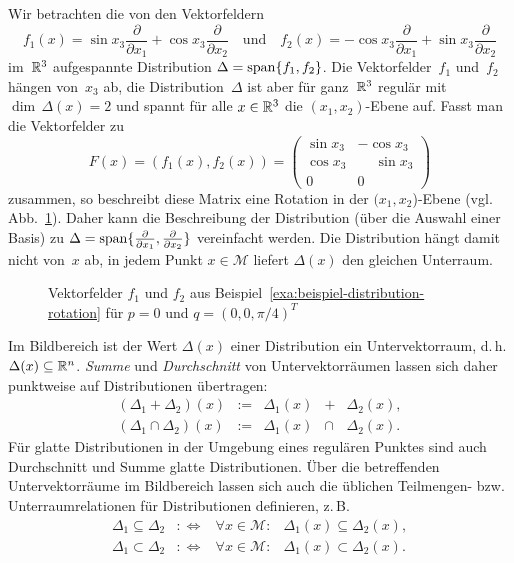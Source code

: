 \begin{example}
\label{exa:beispiel-distribution-rotation}Wir betrachten die von
den Vektorfeldern 
\[
f_{1}(x)=\sin x_{3}\frac{\partial}{\partial x_{1}}+\cos x_{3}\frac{\partial}{\partial x_{2}}\quad\mbox{und}\quad f_{2}(x)=-\cos x_{3}\frac{\partial}{\partial x_{1}}+\sin x_{3}\frac{\partial}{\partial x_{2}}
\]
im~${\mathbb{R}}^{3}$ aufgespannte Distribution $\Delta={\operatorname{span}}\{f_{1},f_{2}\}$.
Die Vektorfelder~$f_{1}$ und~$f_{2}$ hängen von~$x_{3}$ ab,
die Distribution~$\Delta$ ist aber für ganz~${\mathbb{R}}^{3}$ regulär mit
$\dim\,\Delta(x)=2$ und spannt für alle $x\in{\mathbb{R}}^{3}$ die $(x_{1},x_{2})$-Ebene
auf. Fasst man die Vektorfelder zu 
\[
F(x)=\left(f_{1}(x),f_{2}(x)\right)=\left(\begin{array}{cc}
\sin x_{3} & -\cos x_{3}\\
\cos x_{3} & \phantom{{-}}\sin x_{3}\\
0 & 0
\end{array}\right)
\]
zusammen, so beschreibt diese Matrix eine Rotation in der $(x_{1},x_{2}$)-Ebene
(vgl. Abb.~\ref{fig:beispiel-distribution-rotation}). Daher kann
die Beschreibung der Distribution (über die Auswahl einer Basis) zu
$\Delta={\operatorname{span}}\{\frac{\partial}{\partial x_{1}},\frac{\partial}{\partial x_{2}}\}$
vereinfacht werden. Die Distribution hängt damit nicht von~$x$ ab,
in jedem Punkt $x\in\mathcal{M}$ liefert $\Delta(x)$ den gleichen
Unterraum.
\end{example}
\begin{figure}
\begin{centering}
\resizebox{0.75\textwidth}{!}{}
\par\end{centering}
\caption{Vektorfelder $f_{1}$ und $f_{2}$ aus Beispiel~\ref{exa:beispiel-distribution-rotation}
für $p=0$ und $q=(0,0,\pi/4)^{T}$\label{fig:beispiel-distribution-rotation}}

\end{figure}

Im Bildbereich ist der Wert $\Delta(x)$ einer Distribution ein Unter\-vektor\-raum,
d.\,h. $\Delta(x)\subseteq{\mathbb{R}}^{n}$. \emph{Summe} und \emph{Durchschnitt}
von Unter\-vektor\-räumen lassen sich daher punktweise auf Distributionen
übertragen: 
\[
\begin{array}{rclcl}
\left(\Delta_{1}+\Delta_{2}\right)(x) & := & \Delta_{1}(x) & + & \Delta_{2}(x),\\
\left(\Delta_{1}\cap\Delta_{2}\right)(x) & := & \Delta_{1}(x) & \cap & \Delta_{2}(x).
\end{array}
\]
Für glatte Distributionen in der Umgebung eines regulären Punktes
sind auch Durchschnitt und Summe glatte Distributionen. Über die betreffenden
Untervektorräume im Bildbereich lassen sich auch die üblichen Teilmengen-
bzw. Unterraumrelationen für Distributionen definieren, z.\,B. 
\[
\begin{array}{rccl}
\Delta_{1}\subseteq\Delta_{2} & :\Longleftrightarrow & \forall x\in\mathcal{M}: & \Delta_{1}(x)\subseteq\Delta_{2}(x),\\
\Delta_{1}\subset\Delta_{2} & :\Longleftrightarrow & \forall x\in\mathcal{M}: & \Delta_{1}(x)\subset\Delta_{2}(x).
\end{array}
\]

